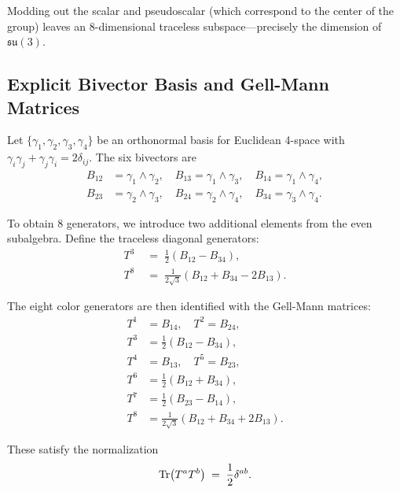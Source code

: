 \documentclass[11pt,a4paper]{article}
\theoremstyle{definition}
\theoremstyle{plain}
\theoremstyle{remark}
\begin{document}
Modding out the scalar and pseudoscalar (which correspond to the center of the group) leaves an 8-dimensional traceless subspace---precisely the dimension of $\mathfrak{su}(3)$.

\subsection{Explicit Bivector Basis and Gell-Mann Matrices}

Let $\{\gamma_1, \gamma_2, \gamma_3, \gamma_4\}$ be an orthonormal basis for Euclidean 4-space with $\gamma_i \gamma_j + \gamma_j \gamma_i = 2\delta_{ij}$. The six bivectors are
\begin{equation}
\begin{aligned}
B_{12} &= \gamma_1 \wedge \gamma_2, \quad B_{13} = \gamma_1 \wedge \gamma_3, \quad B_{14} = \gamma_1 \wedge \gamma_4, \\
B_{23} &= \gamma_2 \wedge \gamma_3, \quad B_{24} = \gamma_2 \wedge \gamma_4, \quad B_{34} = \gamma_3 \wedge \gamma_4.
\end{aligned}
\label{eq:bivector-basis-6d}
\end{equation}

To obtain 8 generators, we introduce two additional elements from the even subalgebra. Define the traceless diagonal generators:
\begin{align}
T^3 &\;=\; \frac{1}{2}(B_{12} - B_{34}), \\
T^8 &\;=\; \frac{1}{2\sqrt{3}}(B_{12} + B_{34} - 2B_{13}).
\end{align}

The eight color generators are then identified with the Gell-Mann matrices:
\begin{align}
T^1 &= B_{14}, \quad T^2 = B_{24}, \nonumber \\
T^3 &= \frac{1}{2}(B_{12} - B_{34}), \nonumber \\
T^4 &= B_{13}, \quad T^5 = B_{23}, \nonumber \\
T^6 &= \frac{1}{2}(B_{12} + B_{34}), \nonumber \\
T^7 &= \frac{1}{2}(B_{23} - B_{14}), \nonumber \\
T^8 &= \frac{1}{2\sqrt{3}}(B_{12} + B_{34} + 2B_{13}).
\label{eq:color-generators}
\end{align}

These satisfy the normalization
\begin{equation}
\Tr(T^a T^b) \;=\; \frac{1}{2}\delta^{ab}.
\end{equation}
\end{document}
